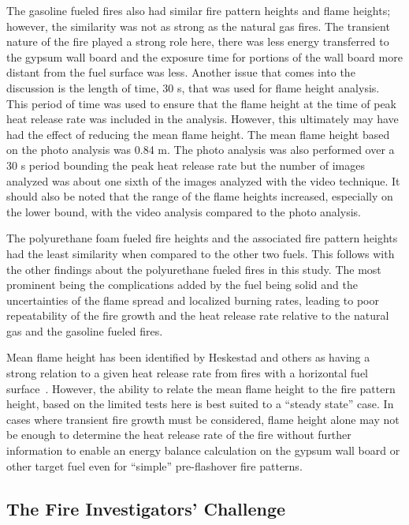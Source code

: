\documentclass[twoside]{uocthesis}
\begin{document}
The gasoline fueled fires also had similar fire pattern heights and flame heights; however, the similarity was not as strong as the natural gas fires.  The transient nature of the fire played a strong role here, there was less energy transferred to the gypsum wall board and the exposure time for portions of the wall board more distant from the fuel surface was less.  Another issue that comes into the discussion is the length of time, 30 s, that was used for flame height analysis.  This period of time was used to ensure that the flame height at the time of peak heat release rate was included in the analysis.  However, this ultimately may have had the effect of reducing the mean flame height.  The mean flame height based on the photo analysis was 0.84 m.  The photo analysis was also performed over a 30 s period bounding the peak heat release rate but the number of images analyzed was about one sixth of the images analyzed with the video technique.
It should also be noted that the range of the flame heights increased, especially on the lower bound, with the video analysis compared to the photo analysis.

The polyurethane foam fueled fire heights and the associated fire pattern heights had the least similarity when compared to the other two fuels.  This follows with the other findings about the polyurethane fueled fires in this study.  The most prominent being the complications added by the fuel being solid and the uncertainties of the flame spread and localized burning rates, leading to poor repeatability of the fire growth and the heat release rate relative to the natural gas and the gasoline fueled fires.  
         
Mean flame height has been identified by Heskestad and others as having a strong relation to a given heat release rate from fires with a horizontal fuel surface~\cite{Heskestad:SFPE, Beyler:1986}.  However, the ability to relate the mean flame height to the fire pattern height, based on the limited tests here is best suited to a “steady state” case.  In cases where transient fire growth must be considered, flame height alone may not be enough to determine the heat release rate of the fire without further information to enable an energy balance calculation on the gypsum wall board or other target fuel even for “simple” pre-flashover fire patterns.


\subsection{The Fire Investigators' Challenge}
\end{document}
